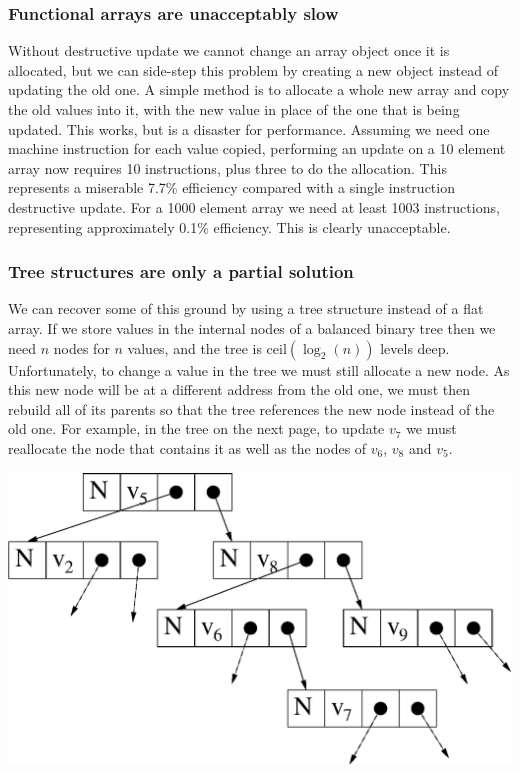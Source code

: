 \subsubsection{Functional arrays are unacceptably slow}
Without destructive update we cannot change an array object once it is allocated, but we can side-step this problem by creating a new object instead of updating the old one. A simple method is to allocate a whole new array and copy the old values into it, with the new value in place of the one that is being updated. This works, but is a disaster for performance. Assuming we need one machine instruction for each value copied, performing an update on a 10 element array now requires 10 instructions, plus three to do the allocation. This represents a miserable 7.7\% efficiency compared with a single instruction destructive update. For a 1000 element array we need at least 1003 instructions, representing approximately 0.1\% efficiency. This is clearly unacceptable.


\subsubsection{Tree structures are only a partial solution}
We can recover some of this ground by using a tree structure instead of a flat array. If we store values in the internal nodes of a balanced binary tree then we need $n$ nodes for $n$ values, and the tree is $\text{ceil} (\log_2(n))$ levels deep. Unfortunately, to change a value in the tree we must still allocate a new node. As this new node will be at a different address from the old one, we must then rebuild all of its parents so that the tree references the new node instead of the old one. For example, in the tree on the next page, to update $v_7$ we must reallocate the node that contains it as well as the nodes of $v_6$, $v_8$ and $v_5$.

\begin{center}
\includegraphics[scale=0.5]{1-Introduction/fig/destructive/data-tree}
\end{center}

